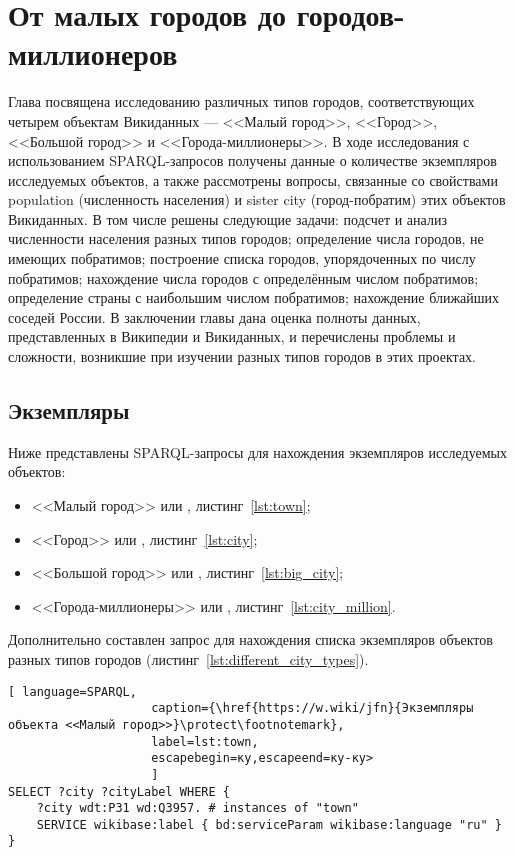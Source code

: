 \chapter{От малых городов до городов-миллионеров}
\label{ch:city}

Глава посвящена исследованию различных типов городов, соответствующих четырем объектам Викиданных — <<Малый город>>, <<Город>>, <<Большой город>> и <<Города-миллионеры>>. В ходе исследования с использованием SPARQL-запросов получены данные о количестве экземпляров исследуемых объектов, а также рассмотрены вопросы, связанные со свойствами population (численность населения) и sister city (город-побратим) этих объектов Викиданных. В том числе решены следующие задачи: подсчет и анализ численности населения разных типов городов; определение числа городов, не имеющих побратимов; построение списка городов, упорядоченных по числу побратимов; нахождение числа городов с определённым числом побратимов; определение страны с наибольшим числом побратимов; нахождение ближайших соседей России. В заключении главы дана оценка полноты данных, представленных в Википедии и Викиданных, и перечислены проблемы и сложности, возникшие при изучении разных типов городов в этих проектах.
\section{Экземпляры}

Ниже представлены SPARQL-запросы для нахождения экземпляров исследуемых объектов: 
\begin{itemize}
	\item <<Малый город>> или , листинг~\ref{lst:town};
	\item <<Город>> или , листинг~\ref{lst:city};
	\item <<Большой город>> или , листинг~\ref{lst:big_city};
	\item <<Города-миллионеры>> или , листинг~\ref{lst:city_million}.
\end{itemize}

Дополнительно составлен запрос для нахождения списка экземпляров объектов разных типов городов (листинг~\ref{lst:different_city_types}).

\begin{lstlisting}[ language=SPARQL, 
                    caption={\href{https://w.wiki/jfn}{Экземпляры объекта <<Малый город>>}\protect\footnotemark},
                    label=lst:town, 
                    escapebegin=ку,escapeend=ку-ку>
                    ]
SELECT ?city ?cityLabel WHERE {
	?city wdt:P31 wd:Q3957. # instances of "town"
	SERVICE wikibase:label { bd:serviceParam wikibase:language "ru" }
}
\end{lstlisting}

